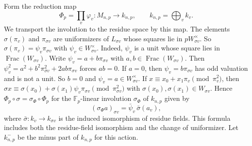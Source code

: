 \documentclass[11pt]{article}
\theoremstyle{plain}
\theoremstyle{definition}
\theoremstyle{remark}
\DeclareMathOperator{\Frac}{Frac}
\newcommand{\F}{\mathbb F}
\begin{document}
Form the reduction map
\[
 \Phi_p=\prod_v\varphi_v:M_{n,p}\longrightarrow k_{n,p},\qquad
 k_{n,p}=\bigoplus_vk_v .
\]
We transport the involution to the residue space by this map.  The
elements $\sigma(\pi_v)$ and $\pi_{\sigma v}$ are uniformizers of
$L_{\sigma v}$ whose squares lie in $pW_{\sigma v}^\times$.  So
$\sigma(\pi_v)=\psi_v\pi_{\sigma v}$ with $\psi_v\in W_{\sigma v}^\times$.
Indeed, $\psi_v$ is a unit whose square lies in $\Frac(W_{\sigma v})$.
Write $\psi_v=a+b\pi_{\sigma v}$ with $a,b\in\Frac(W_{\sigma v})$.  Then
$\psi_v^2=a^2+b^2\pi_{\sigma v}^2+2ab\pi_{\sigma v}$ forces $ab=0$.  If
$a=0$, then $\psi_v=b\pi_{\sigma v}$ has odd valuation and is not a unit.
So $b=0$ and $\psi_v=a\in W_{\sigma v}^\times$.  If $x\equiv x_0+x_1\pi_v\pmod{\pi_v^2}$, then
$\sigma x\equiv\sigma(x_0)+\sigma(x_1)\psi_v\pi_{\sigma v}
\pmod{\pi_{\sigma v}^2}$ with $\sigma(x_0),\sigma(x_1)\in W_{\sigma v}$.
Hence $\Phi_p\circ\sigma=\sigma_\Phi\circ\Phi_p$ for the $\F_p$-linear
involution $\sigma_\Phi$ of $k_{n,p}$ given by
\begin{equation}\label{eq:transported-sigma}
 (\sigma_\Phi a)_{\sigma v}
       =\bar\psi_v\,\bar\sigma(a_v),
\end{equation}
where $\bar\sigma:k_v\to k_{\sigma v}$ is the induced isomorphism of
residue fields.  This formula includes both the residue-field isomorphism
and the change of uniformizer.  Let $k_{n,p}^-$ be the minus part of
$k_{n,p}$ for this action.
\end{document}
